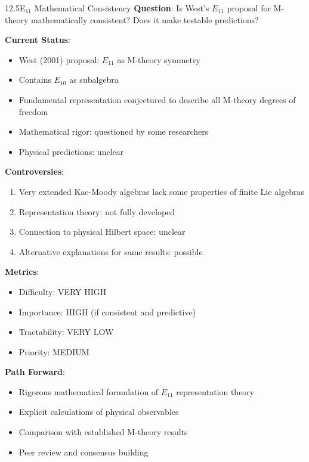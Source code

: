 \begin{openproblem}{12.5}{E$_{11}$ Mathematical Consistency}
\textbf{Question}: Is West's $E_{11}$ proposal for M-theory mathematically consistent? Does it make testable predictions?

\textbf{Current Status}:
\begin{itemize}
    \item West (2001) proposal: $E_{11}$ as M-theory symmetry \cite{west2001e11}
    \item Contains $E_{10}$ as subalgebra
    \item Fundamental representation conjectured to describe all M-theory degrees of freedom
    \item Mathematical rigor: questioned by some researchers
    \item Physical predictions: unclear
\end{itemize}

\textbf{Controversies}:
\begin{enumerate}
    \item Very extended Kac-Moody algebras lack some properties of finite Lie algebras
    \item Representation theory: not fully developed
    \item Connection to physical Hilbert space: unclear
    \item Alternative explanations for same results: possible
\end{enumerate}

\textbf{Metrics}:
\begin{itemize}
    \item Difficulty: VERY HIGH
    \item Importance: HIGH (if consistent and predictive)
    \item Tractability: VERY LOW
    \item Priority: MEDIUM
\end{itemize}

\textbf{Path Forward}:
\begin{itemize}
    \item Rigorous mathematical formulation of $E_{11}$ representation theory
    \item Explicit calculations of physical observables
    \item Comparison with established M-theory results
    \item Peer review and consensus building
\end{itemize}
\end{openproblem}

